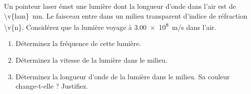 Un pointeur laser émet une lumière dont la longueur d'onde dans l'air est de \qty{\v{lam}}{nm}. Le faisceau entre dans un milieu transparent d'indice de réfraction \num{\v{n}}. Considérez que la lumière voyage à \qty{3.00e8}{m/s} dans l'air.

\begin{enumerate}[label=\alph*)]
    \item Déterminez la fréquence de cette lumière.
    \item Déterminez la vitesse de la lumière dans le milieu.
    \item Déterminez la longueur d'onde de la lumière dans le milieu. Sa couleur change-t-elle ? Justifiez.
\end{enumerate}
